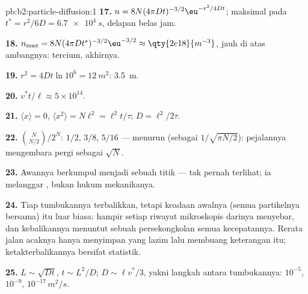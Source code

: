 \begin{solution}{pb:b2:particle-diffusion:1}
\textbf{17.} $n = 8N(4\pi Dt)^{-3/2}\eu^{-r^2/4Dt}$; maksimal pada $t^* = r^2/6D =
\qty{6.7e4}{s}$, delapan belas jam.

\textbf{18.} $n_{\max} = 8N(4\pi Dt^*)^{-3/2}\eu^{-3/2} \approx \qty{2e18}{m^{-3}}$,
jauh di atas ambangnya: tercium, akhirnya.

\textbf{19.} $r^2 = 4Dt\ln 10^6 = \qty{12}{m^2}$: \qty{3.5}{m}.

\textbf{20.} $v^*t/\ell \approx 5 \times 10^{14}$.

\textbf{21.} $\langle x\rangle = 0$, $\langle x^2\rangle = N\ell^2 = \ell^2 t/\tau$;
$D = \ell^2/2\tau$.

\textbf{22.} $\binom{N}{N/2}/2^N$: $1/2$, $3/8$, $5/16$ --- menurun
(sebagai $1/\sqrt{\pi N/2}$): pejalannya mengembara pergi sebagai $\sqrt N$.

\textbf{23.} Awannya berkumpul menjadi sebuah titik --- tak pernah terlihat; ia
melanggar , bukan hukum mekanikanya.

\textbf{24.} Tiap tumbukannya terbalikkan, tetapi keadaan awalnya (semua
partikelnya bersama) itu luar biasa: hampir setiap riwayat mikroskopis
darinya menyebar, dan kebalikannya menuntut sebuah persekongkolan semua
kecepatannya. Rerata jalan acaknya hanya menyimpan yang lazim lalu
membuang keterangan itu; ketakterbalikannya bersifat statistik.

\textbf{25.} $L \sim \sqrt{Dt}$, $t \sim L^2/D$; $D \sim \ell v^*/3$, yakni
langkah antara tumbukannya: $10^{-5}$, $10^{-9}$, $10^{-17}\,\unit{m^2/s}$.
\end{solution}
